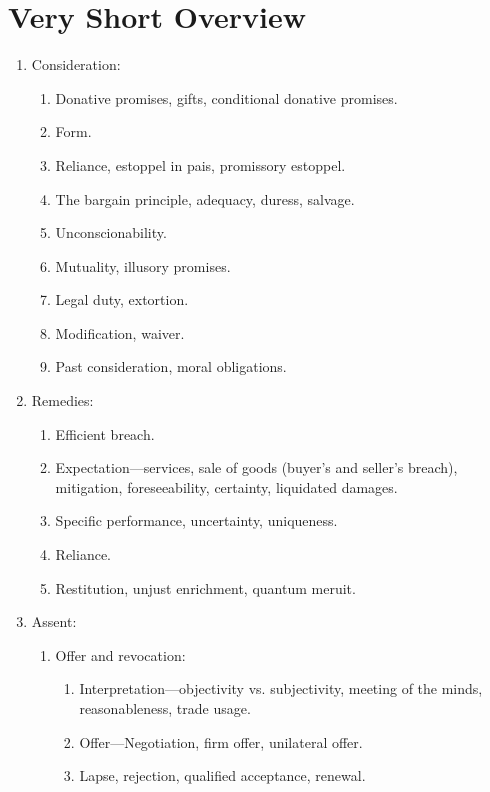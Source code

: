 \section{Very Short Overview}

\begin{enumerate}
    \item Consideration:
    \begin{enumerate}
        \item Donative promises, gifts, conditional donative promises.
        \item Form.
        \item Reliance, estoppel in pais, promissory estoppel.
        \item The bargain principle, adequacy, duress, salvage.
        \item Unconscionability.
        \item Mutuality, illusory promises.
        \item Legal duty, extortion.
        \item Modification, waiver.
        \item Past consideration, moral obligations.
    \end{enumerate}
    \item Remedies:
    \begin{enumerate}
        \item Efficient breach.
        \item Expectation---services, sale of goods (buyer's and seller's 
        breach), mitigation, foreseeability, certainty, liquidated damages.
        \item Specific performance, uncertainty, uniqueness.
        \item Reliance.
        \item Restitution, unjust enrichment, quantum meruit.
    \end{enumerate}
    \item Assent:
    \begin{enumerate}
        \item Offer and revocation:
        \begin{enumerate}
            \item Interpretation---objectivity vs. subjectivity, meeting of 
            the minds, reasonableness, trade usage.
            \item Offer---Negotiation, firm offer, unilateral offer.
            \item Lapse, rejection, qualified acceptance, renewal.

\end{enumerate}
\end{enumerate}
\end{enumerate}
